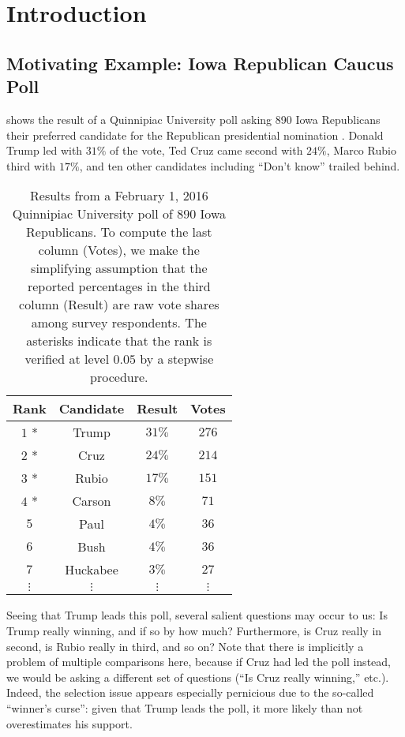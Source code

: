 \documentclass[aos, authoryear]{imsart}
\theoremstyle{definition}
\theoremstyle{custom}
\begin{document}
\section{Introduction}
\label{sec:intro}

\subsection{Motivating Example: Iowa Republican Caucus Poll}
\label{sec:iowa}

 shows the result of a Quinnipiac University poll asking 890 Iowa Republicans their preferred candidate for the Republican presidential nomination \citep{quinnipiac}. Donald Trump led with $31\%$ of the vote, Ted Cruz came second with $24\%$, Marco Rubio third with $17\%$, and ten other candidates including ``Don't know'' trailed behind. 

\begin{table}[htbp]
\centering
\begin{tabular}{c c c c}
	\hline
	Rank & Candidate & Result & Votes \\
	\hline
	$1$ * & Trump & $31\%$ & $276$ \\
	$2$ * & Cruz & $24\%$ & $214$ \\
	$3$ * & Rubio & $17\%$ & $151$ \\
	$4$ * & Carson & $8\%$ & $71$ \\
	$5$ & Paul & $4\%$ & $36$ \\
	$6$ & Bush & $4\%$ & $36$ \\
	$7$ & Huckabee & $3\%$ & $27$ \\
	$\vdots$ & $\vdots$ & $\vdots $ & $\vdots$ \\
	\hline
\end{tabular}
\caption{Results from a February 1, 2016 Quinnipiac University poll of $890$ Iowa Republicans. To compute the last column (Votes), we make the simplifying assumption that the reported percentages in the third column (Result) are raw vote shares among survey respondents. The asterisks indicate that the rank is verified at level $0.05$ by a stepwise procedure.}
\label{tbl:poll}
\end{table}

Seeing that Trump leads this poll, several salient questions may occur to us: Is Trump really winning, and if so by how much? Furthermore, is Cruz really in second, is Rubio really in third, and so on? Note that there is implicitly a problem of multiple comparisons here, because if Cruz had led the poll instead, we would be asking a different set of questions (``Is Cruz really winning,'' etc.). Indeed, the selection issue appears especially pernicious due to the so-called ``winner's curse'': given that Trump leads the poll, it more likely than not overestimates his support.
\end{document}
